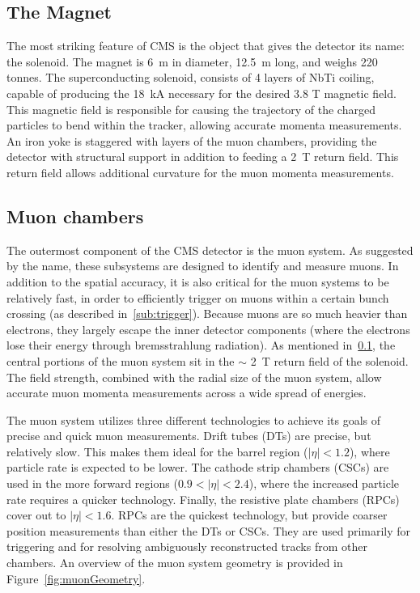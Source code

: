 \subsection{The Magnet}
\label{sub:magnet}
The most striking feature of CMS is the object that gives the detector its name:
the solenoid. The magnet is 6~m in diameter, 12.5~m long, and weighs 220 tonnes.
The superconducting solenoid, consists of 4 layers of NbTi coiling, capable of
producing the 18~kA necessary for the desired 3.8 T magnetic field. This
magnetic field is responsible for causing the trajectory of the charged
particles to bend within the tracker, allowing accurate momenta measurements.
An iron yoke is staggered with layers of the muon chambers, providing the
detector with structural support in addition to feeding a 2~T return field. This
return field allows additional curvature for the muon momenta measurements.

\subsection{Muon chambers}
The outermost component of the CMS detector is the muon system. As suggested by
the name, these subsystems are designed to identify and measure muons. In
addition to the spatial accuracy, it is also critical for the muon systems to be
relatively fast, in order to efficiently trigger on muons within a certain bunch
crossing (as described in~\ref{sub:trigger}). Because muons are so much heavier
than electrons, they largely escape the inner detector components (where the
electrons lose their energy through bremsstrahlung radiation). As mentioned
in~\ref{sub:magnet}, the central portions of the muon system sit in the $\sim$
2~T return field of the solenoid. The field strength, combined with the radial
size of the muon system, allow accurate muon momenta measurements across a wide
spread of energies.

The muon system utilizes three different technologies to achieve its goals of
precise and quick muon measurements. Drift tubes (DTs) are precise, but
relatively slow. This makes them ideal for the barrel region ($|\eta|<1.2$), where particle
rate is expected to be lower. The cathode strip chambers (CSCs) are used
in the more forward regions ($0.9 < |\eta| < 2.4$), where the increased particle
rate requires a quicker technology. Finally, the resistive plate chambers
(RPCs) cover out to $|\eta|<1.6$. RPCs are the quickest technology, but provide
coarser position measurements than either the DTs or CSCs. They are used
primarily for triggering and for resolving ambiguously reconstructed tracks from
other chambers. An overview of the muon system geometry is provided in
Figure~\ref{fig:muonGeometry}.


